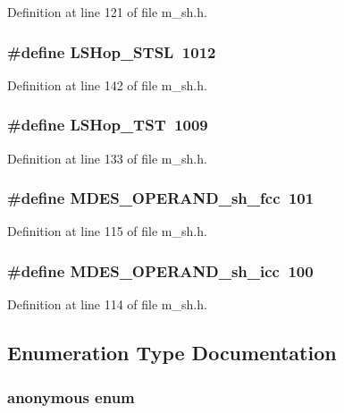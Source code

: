 Definition at line 121 of file m\_\-sh.h.
\subsubsection{\setlength{\rightskip}{0pt plus 5cm}\#define LSHop\_\-STSL~1012}\label{m__sh_8h_8be183f1928e67ddcc98030e81cf5cb9}




Definition at line 142 of file m\_\-sh.h.
\subsubsection{\setlength{\rightskip}{0pt plus 5cm}\#define LSHop\_\-TST~1009}\label{m__sh_8h_a6e4a63f15d483a4fd24b1941f21c979}




Definition at line 133 of file m\_\-sh.h.
\subsubsection{\setlength{\rightskip}{0pt plus 5cm}\#define MDES\_\-OPERAND\_\-sh\_\-fcc~101}\label{m__sh_8h_044b4a056096bfedf92fea1375581ce2}




Definition at line 115 of file m\_\-sh.h.
\subsubsection{\setlength{\rightskip}{0pt plus 5cm}\#define MDES\_\-OPERAND\_\-sh\_\-icc~100}\label{m__sh_8h_f09d28d0995cef009954dc60c292c2ca}




Definition at line 114 of file m\_\-sh.h.

\subsection{Enumeration Type Documentation}
\subsubsection{\setlength{\rightskip}{0pt plus 5cm}anonymous enum}\label{m__sh_8h_385c44f6fb256e5716a2302a5b940388}


